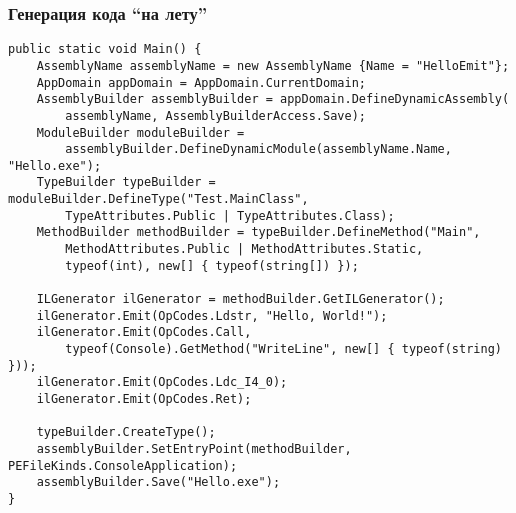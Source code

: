 \documentclass[xetex,mathserif,serif]{beamer}
\begin{document}
	\begin{frame}[fragile]
		\frametitle{Генерация кода ``на лету''}
		\begin{scriptsize}
			\begin{verbatim}
public static void Main() {
    AssemblyName assemblyName = new AssemblyName {Name = "HelloEmit"};
    AppDomain appDomain = AppDomain.CurrentDomain;
    AssemblyBuilder assemblyBuilder = appDomain.DefineDynamicAssembly(
        assemblyName, AssemblyBuilderAccess.Save);
    ModuleBuilder moduleBuilder = 
        assemblyBuilder.DefineDynamicModule(assemblyName.Name, "Hello.exe");
    TypeBuilder typeBuilder = moduleBuilder.DefineType("Test.MainClass",
        TypeAttributes.Public | TypeAttributes.Class);
    MethodBuilder methodBuilder = typeBuilder.DefineMethod("Main",
        MethodAttributes.Public | MethodAttributes.Static,
        typeof(int), new[] { typeof(string[]) });

    ILGenerator ilGenerator = methodBuilder.GetILGenerator();
    ilGenerator.Emit(OpCodes.Ldstr, "Hello, World!");
    ilGenerator.Emit(OpCodes.Call,
        typeof(Console).GetMethod("WriteLine", new[] { typeof(string) }));
    ilGenerator.Emit(OpCodes.Ldc_I4_0);
    ilGenerator.Emit(OpCodes.Ret);

    typeBuilder.CreateType();
    assemblyBuilder.SetEntryPoint(methodBuilder, PEFileKinds.ConsoleApplication);
    assemblyBuilder.Save("Hello.exe");
}
			\end{verbatim}
		\end{scriptsize}
	\end{frame}
\end{document}

